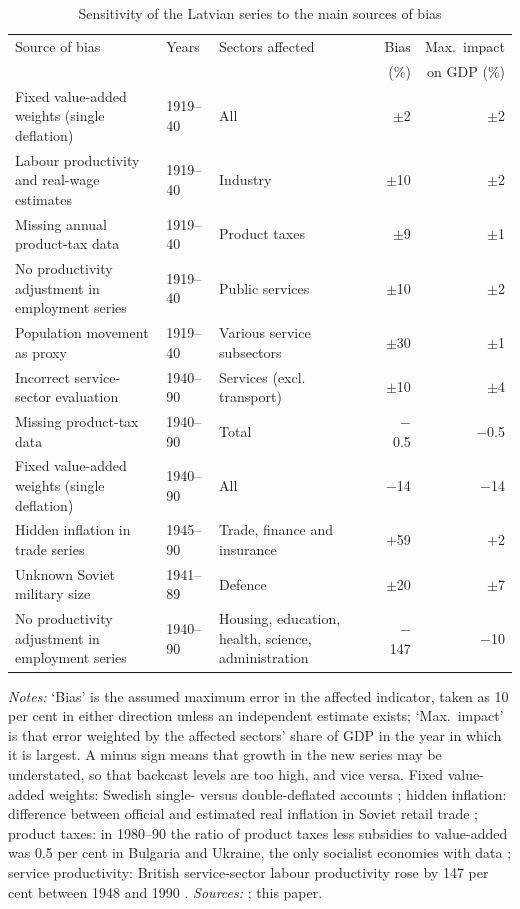 \begin{table}[htbp]
\centering\footnotesize
\caption{Sensitivity of the Latvian series to the main sources of bias}
\label{tab:sensitivity}
\begin{threeparttable}
\begin{tabular}{p{4.6cm}lp{3.8cm}rr}
\toprule
Source of bias & Years & Sectors affected & Bias & Max.\ impact \\
& & & (\%) & on GDP (\%) \\
\midrule
Fixed value-added weights (single deflation) & 1919--40 & All & $\pm$2 & $\pm$2 \\
Labour productivity and real-wage estimates & 1919--40 & Industry & $\pm$10 & $\pm$2 \\
Missing annual product-tax data & 1919--40 & Product taxes & $\pm$9 & $\pm$1 \\
No productivity adjustment in employment series & 1919--40 & Public services & $\pm$10 & $\pm$2 \\
Population movement as proxy & 1919--40 & Various service subsectors & $\pm$30 & $\pm$1 \\
\midrule
Incorrect service-sector evaluation & 1940--90 & Services (excl. transport) & $\pm$10 & $\pm$4 \\
Missing product-tax data & 1940--90 & Total & $-$0.5 & $-$0.5 \\
Fixed value-added weights (single deflation) & 1940--90 & All & $-$14 & $-$14 \\
Hidden inflation in trade series & 1945--90 & Trade, finance and insurance & $+$59 & $+$2 \\
Unknown Soviet military size & 1941--89 & Defence & $\pm$20 & $\pm$7 \\
No productivity adjustment in employment series & 1940--90 & Housing, education, health, science, administration & $-$147 & $-$10 \\
\bottomrule
\end{tabular}
\begin{tablenotes}
\footnotesize
\textit{Notes:} `Bias' is the assumed maximum error in the affected indicator, taken as 10 per cent in either direction unless an independent estimate exists; `Max.\ impact' is that error weighted by the affected sectors' share of GDP in the year in which it is largest. A minus sign means that growth in the new series may be understated, so that backcast levels are too high, and vice versa. Fixed value-added weights: Swedish single- versus double-deflated accounts \parencites[19]{swedengdp_15602010}[148--53]{lobellschonkrantz2008}; hidden inflation: difference between official and estimated real inflation in Soviet retail trade \parencite[607]{hidden_inflation_sov}; product taxes: in 1980--90 the ratio of product taxes less subsidies to value-added was 0.5 per cent in Bulgaria and Ukraine, the only socialist economies with data \parencite{wdi2024}; service productivity: British service-sector labour productivity rose by 147 per cent between 1948 and 1990 \parencite{statisticsUKlabour}. \textit{Sources:} \textcite[149--56]{klimantas2025thesis}; this paper.
\end{tablenotes}
\end{threeparttable}
\end{table}
